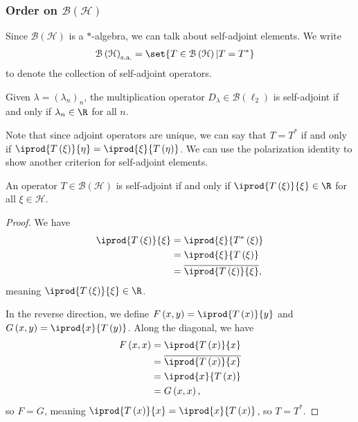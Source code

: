 \documentclass[10pt]{mypackage}
\newcommand{\sa}{\text{s.a.}}
\begin{document}
\subsubsection{Order on $\mathcal{B}\left(\mathcal{H}\right)$}%
Since $\mathcal{B}\left(\mathcal{H}\right)$ is a $\ast$-algebra, we can talk about self-adjoint elements. We write
\begin{align*}
  \mathcal{B}\left(\mathcal{H}\right)_{\sa} &= \set{T\in \mathcal{B}\left(\mathcal{H}\right)|T = T^{\ast}}
\end{align*}
to denote the collection of self-adjoint operators.
\begin{example}
  Given $\lambda = \left(\lambda_n\right)_n$, the multiplication operator $D_{\lambda}\in \mathcal{B}\left(\ell_2\right)$ is self-adjoint if and only if $\lambda_n\in \R$ for all $n$.
\end{example}
Note that since adjoint operators are unique, we can say that $T = T^{\ast}$ if and only if $ \iprod{T\left(\xi\right)}{\eta} = \iprod{\xi}{T\left(\eta\right)} $. We can use the polarization identity to show another criterion for self-adjoint elements.
\begin{lemma}
  An operator $T\in \mathcal{B}\left(\mathcal{H}\right)$ is self-adjoint if and only if $ \iprod{T\left(\xi\right)}{\xi}\in \R $ for all $\xi\in \mathcal{H}$.
\end{lemma}
\begin{proof}
  We have
  \begin{align*}
    \iprod{T\left(\xi\right)}{\xi} &= \iprod{\xi}{T^{\ast}\left(\xi\right)}\\
                                   &= \iprod{\xi}{T\left(\xi\right)}\\
                                   &= \overline{ \iprod{T\left(\xi\right)}{\xi} },
  \end{align*}
  meaning $ \iprod{T\left(\xi\right)}{\xi}\in \R $.\newline

  In the reverse direction, we define $F\left(x,y\right) = \iprod{T\left(x\right)}{y}$ and $ G\left(x,y\right) = \iprod{x}{T\left(y\right)} $. Along the diagonal, we have
  \begin{align*}
    F\left(x,x\right) &= \iprod{T\left(x\right)}{x}\\
                      &= \overline{ \iprod{T\left(x\right)}{x} }\\
                      &= \iprod{x}{T\left(x\right)}\\
                      &= G\left(x,x\right),
  \end{align*}
  so $F = G$, meaning $ \iprod{T\left(x\right)}{x} = \iprod{x}{T\left(x\right)} $, so $T = T^{\ast}$.
\end{proof}
\end{document}
